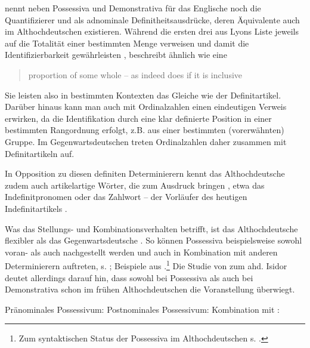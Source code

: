 \textcite[32--34]{Lyons1999} nennt neben Possessiva  und Demonstrativa  für das Englische noch die   Quantifizierer  und  als adnominale Definitheitsausdrücke,  deren Äquivalente auch im Althochdeutschen existieren. Während die ersten drei aus Lyons Liste jeweils auf die Totalität einer bestimmten Menge verweisen und damit die Identifizierbarkeit gewährleisten \parencite[vgl. auch][334]{Hoffmann2009}, beschreibt  ähnlich wie  eine \blockcquote[33]{Lyons1999}{proportion of some whole -- as indeed does  if it is inclusive}. Sie leisten also in bestimmten Kontexten das Gleiche wie der Definitartikel. 
Darüber hinaus kann man auch mit Ordinalzahlen einen eindeutigen Verweis erwirken, da die Identifikation durch eine klar definierte Position in einer bestimmten Rangordnung erfolgt, z.B.  aus einer bestimmten (vorerwähnten) Gruppe. Im Gegenwartsdeutschen treten Ordinalzahlen daher zusammen mit Definitartikeln  auf.

In Opposition zu diesen definiten Determinierern  kennt das Althochdeutsche zudem auch artikelartige Wörter, die  zum Ausdruck bringen \parencite[253--254]{Braune2004}, etwa das Indefinitpronomen   \parencite{Donhauser2012} oder das Zahlwort  -- der Vorläufer des heutigen Indefinitartikels  \parencite{Oubouzar2000,Szczepaniak2016}. 

Was das Stellungs- und Kombinationsverhalten betrifft, ist das Althochdeutsche  flexibler als das Gegenwartsdeutsche \parencite[104]{Szczepaniak2011a}. So können Possessiva  beispielsweise sowohl voran- als auch nachgestellt werden und auch in Kombination mit anderen Determinierern  auftreten, s. ; Beispiele aus \textcite[27--28]{Schrodt2004}.\footnote{Zum syntaktischen Status der Possessiva  im Althochdeutschen s. \textcite[132--135]{Demske2001}.} Die Studie von \textcite{Flick2018} zum ahd. Isidor deutet allerdings darauf hin, dass sowohl bei Possessiva  als auch bei Demonstrativa  schon im frühen Althochdeutschen die Voranstellung überwiegt. 

\begin{exe}
	\ex \label{ex:poss-stellung}   
	\begin{xlist}
		\ex \label{ex:possvor} Pränominales Possessivum:  
		\ex \label{ex:possnach} Postnominales Possessivum:   
		\ex \label{ex:posskombi} Kombination mit :  
		\end{xlist}
\end{exe}


